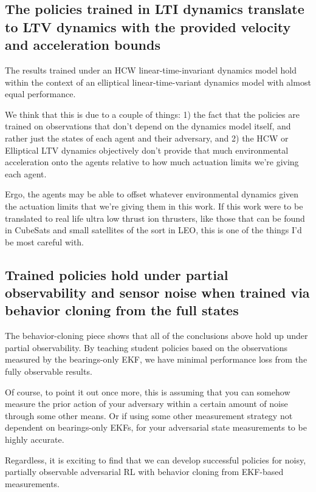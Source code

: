 \subsection*{The policies trained in LTI dynamics translate to LTV dynamics with the provided velocity and acceleration bounds}

The results trained under an HCW linear-time-invariant dynamics model hold within the context of an elliptical linear-time-variant dynamics model with almost equal performance. 

We think that this is due to a couple of things: 1) the fact that the policies are trained on observations that don't depend on the dynamics model itself, and rather just the states of each agent and their adversary, and 2) the HCW or Elliptical LTV dynamics objectively don't provide that much environmental acceleration onto the agents relative to how much actuation limits we're giving each agent.

Ergo, the agents may be able to offset whatever environmental dynamics given the actuation limits that we're giving them in this work. If this work were to be translated to real life ultra low thrust ion thrusters, like those that can be found in CubeSats and small satellites of the sort in LEO, this is one of the things I'd be most careful with.


\subsection*{Trained policies hold under partial observability and sensor noise when trained via behavior cloning from the full states}

The behavior-cloning piece shows that all of the conclusions above hold up under partial observability. By teaching student policies based on the observations measured by the bearings-only EKF, we have minimal performance loss from the fully observable results.

Of course, to point it out once more, this is assuming that you can somehow measure the prior action of your adversary within a certain amount of noise through some other means. Or if using some other measurement strategy not dependent on bearings-only EKFs, for your adversarial state measurements to be highly accurate.


Regardless, it is exciting to find that we can develop successful policies for noisy, partially observable adversarial RL with behavior cloning from EKF-based measurements.


